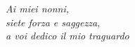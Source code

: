 \hfill
\begin{minipage}[t]{0.47\textwidth}\raggedleft
	{{\large}{\emph{Ai miei nonni,\\
    siete forza e saggezza,\\
    a voi dedico il mio traguardo}}{\normalsize\vspace{3mm}}}
\end{minipage}